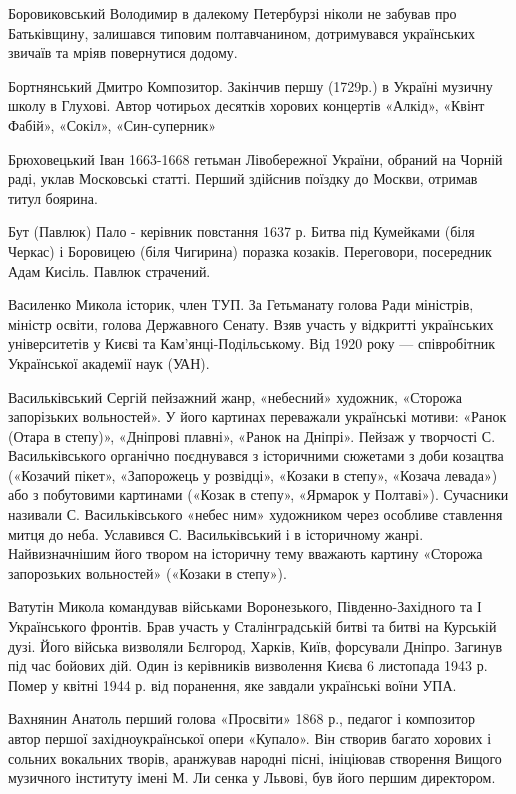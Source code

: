 Боровиковський   Володимир в далекому Петербурзі  ніколи не забував про Батьківщину, залишався типовим полтавчанином, дотримувався українських звичаїв та мріяв повернутися додому.

Бортнянський Дмитро  Композитор. Закінчив першу (1729р.) в Україні музичну школу в Глухові. Автор чотирьох десятків хорових концертів «Алкід», «Квінт Фабій», «Сокіл», «Син-суперник»

Брюховецький  Іван 1663-1668 гетьман Лівобережної України, обраний на Чорній раді, уклав Московські статті. Перший здійснив поїздку до Москви, отримав титул боярина.

Бут (Павлюк) Пало  - керівник повстання 1637 р. Битва під Кумейками (біля Черкас) і Боровицею (біля Чигирина) поразка козаків. Переговори, посередник Адам Кисіль. Павлюк страчений.

Василенко Микола історик, член ТУП. За Гетьманату голова Ради міністрів, міністр освіти, голова Державного Сенату. Взяв участь у відкритті українських університетів у Києві та Кам'янці-Подільському. Від 1920 року --- співробітник Української академії наук (УАН). 

Васильківський Сергій пейзажний жанр, «небесний» художник, «Сторожа запорізьких вольностей». У його картинах переважали українські мотиви: «Ранок (Отара в степу)», «Дніпрові плавні», «Ранок на Дніпрі». Пейзаж у творчості С. Васильківського органічно поєднувався з історичними сюжетами з доби козацтва («Козачий пікет», «Запорожець у розвідці», «Козаки в степу», «Козача левада») або з побутовими картинами («Козак в степу», «Ярмарок у Полтаві»). Сучасники називали С. Васильківського «небес ним» художником через особливе ставлення митця до неба. Уславився С. Васильківський і в історичному жанрі. Найвизначнішим його твором на історичну тему вважають картину «Сторожа запорозьких вольностей» («Козаки в степу»).  

Ватутін Микола командував військами Воронезького, Південно-Західного та І Українського фронтів. Брав участь у Сталінградській битві та битві на Курській дузі. Його війська визволяли Бєлгород, Харків, Київ, форсували Дніпро. Загинув під час бойових дій. Один із керівників визволення Києва 6 листопада 1943 р. Помер у квітні 1944 р. від поранення, яке завдали українські воїни УПА.

Вахнянин Анатоль перший голова «Просвіти» 1868 р., педагог і композитор автор першої західноукраїнської опери «Купало». Він створив багато хорових і сольних вокальних творів, аранжував народні пісні, ініціював створення Вищого музичного інституту імені М. Ли сенка у Львові, був його першим директором.  

